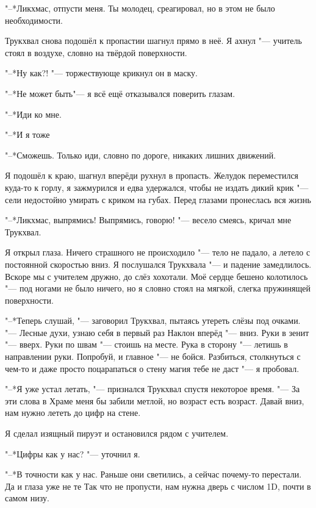 "--*Ликхмас, отпусти меня.
Ты молодец, среагировал, но в этом не было необходимости.

Трукхвал снова подошёл к пропасти\ldotst и шагнул прямо в неё.
Я ахнул "--- учитель стоял в воздухе, словно на твёрдой поверхности.

"--*Ну как?! "--- торжествующе крикнул он в маску.

"--*Не может быть\ldotst "--- я всё ещё отказывался поверить глазам.

"--*Иди ко мне.

"--*И я тоже\ldotsq

"--*Сможешь.
Только иди, словно по дороге, никаких лишних движений.

Я подошёл к краю, шагнул вперёд\ldotst и рухнул в пропасть.
Желудок переместился куда-то к горлу, я зажмурился и едва удержался, чтобы не издать дикий крик "--- сели недостойно умирать с криком на губах.
Перед глазами пронеслась вся жизнь\ldotst

"--*Ликхмас, выпрямись!
Выпрямись, говорю! "--- весело смеясь, кричал мне Трукхвал.

Я открыл глаза.
Ничего страшного не происходило "--- тело не падало, а летело с постоянной скоростью вниз.
Я послушался Трукхвала "--- и падение замедлилось.
Вскоре мы с учителем дружно, до слёз хохотали.
Моё сердце бешено колотилось "--- под ногами не было ничего, но я словно стоял на мягкой, слегка пружинящей поверхности.

"--*Теперь слушай, "--- заговорил Трукхвал, пытаясь утереть слёзы под очками.
"--- Лесные духи, узнаю себя в первый раз\ldotst
Наклон вперёд "--- вниз.
Руки в зенит "--- вверх.
Руки по швам "--- стоишь на месте.
Рука в сторону "--- летишь в направлении руки.
Попробуй, и главное "--- не бойся.
Разбиться, столкнуться с чем-то и даже просто поцарапаться о стену магия тебе не даст "--- я пробовал.

\razd

"--*Я уже устал летать, "--- признался Трукхвал спустя некоторое время.
"--- За эти слова в Храме меня бы забили метлой, но возраст есть возраст.
Давай вниз, нам нужно лететь до цифр на стене.

Я сделал изящный пируэт и остановился рядом с учителем.

"--*Цифры как у нас? "--- уточнил я.

"--*В точности как у нас.
Раньше они светились, а сейчас почему-то перестали.
Да и глаза уже не те\ldotst
Так что не пропусти, нам нужна дверь с числом 1D, почти в самом низу.

